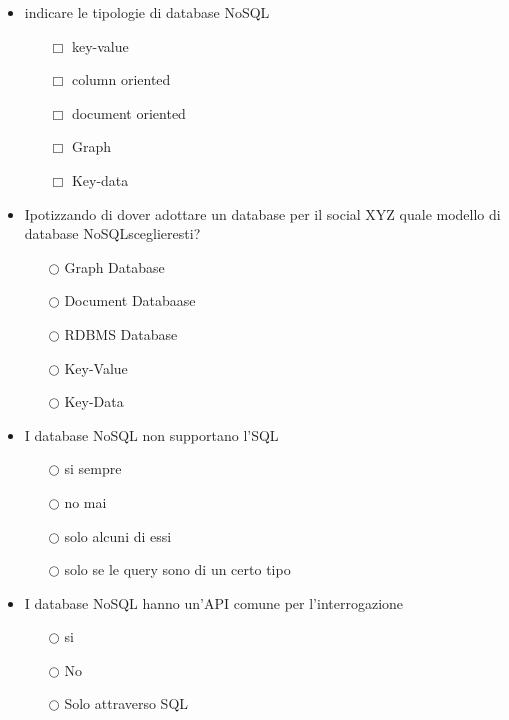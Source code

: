 \documentclass[10pt,twocolumn]{article}
\begin{document}
\begin{itemize}
    \item indicare le tipologie di database NoSQL
          \begin{itemize}
              \item[$\Box$] key-value
              \item[$\Box$] column oriented
              \item[$\Box$] document oriented
              \item[$\Box$] Graph
              \item[$\Box$] Key-data
          \end{itemize}
\end{itemize}
\begin{itemize}
    \item Ipotizzando di dover adottare un database per il social XYZ quale modello di database NoSQLsceglieresti?
          \begin{itemize}
              \item[$\bigcirc$] Graph Database
              \item[$\bigcirc$] Document Databaase
              \item[$\bigcirc$] RDBMS Database
              \item[$\bigcirc$] Key-Value
              \item[$\bigcirc$] Key-Data
          \end{itemize}
\end{itemize}
\begin{itemize}
    \item I database NoSQL non supportano l'SQL
          \begin{itemize}
              \item[$\bigcirc$] si sempre
              \item[$\bigcirc$] no mai
              \item[$\bigcirc$] solo alcuni di essi
              \item[$\bigcirc$] solo se le query sono di un certo tipo
          \end{itemize}
\end{itemize}
\begin{itemize}
    \item I database NoSQL hanno un'API comune per l'interrogazione
          \begin{itemize}
              \item[$\bigcirc$] si
              \item[$\bigcirc$] No
              \item[$\bigcirc$] Solo attraverso SQL
          \end{itemize}
\end{itemize}
\end{document}
